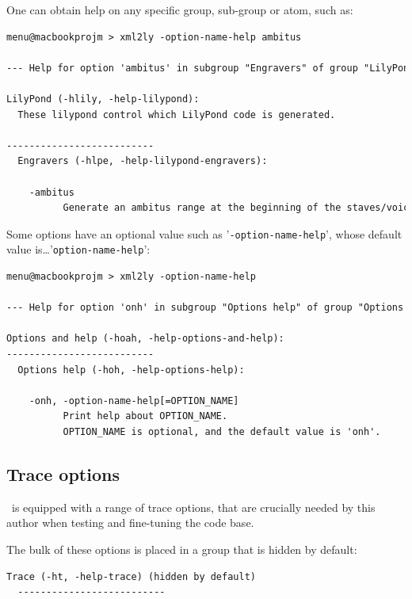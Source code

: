 \documentclass[12pt,a4paper]{article}
\begin{document}
One can obtain help on any specific group, sub-group or atom, such as:
\begin{lstlisting}[language=XML]
menu@macbookprojm > xml2ly -option-name-help ambitus

--- Help for option 'ambitus' in subgroup "Engravers" of group "LilyPond" ---

LilyPond (-hlily, -help-lilypond):
  These lilypond control which LilyPond code is generated.

--------------------------
  Engravers (-hlpe, -help-lilypond-engravers):

    -ambitus
          Generate an ambitus range at the beginning of the staves/voices.

\end{lstlisting}

Some options have an optional value such as '{\tt -option-name-help}', whose default value is\dots '{\tt option-name-help}':
\begin{lstlisting}[language=XML]
menu@macbookprojm > xml2ly -option-name-help

--- Help for option 'onh' in subgroup "Options help" of group "Options and help" ---

Options and help (-hoah, -help-options-and-help):
--------------------------
  Options help (-hoh, -help-options-help):

    -onh, -option-name-help[=OPTION_NAME]
          Print help about OPTION_NAME.
          OPTION_NAME is optional, and the default value is 'onh'.
\end{lstlisting}

\subsection{Trace options}

\xmlToLy\ is equipped with a range of trace options, that are crucially needed by this author when testing and fine-tuning the code base.

The bulk of these options is placed in a group that is hidden by default:
\begin{lstlisting}[language=XML]
  Trace (-ht, -help-trace) (hidden by default)
  --------------------------
\end{lstlisting}
\end{document}
